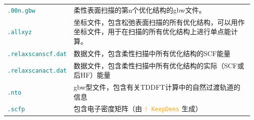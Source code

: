 \documentclass{ctexart}
\newcommand{\cmd}[1]{\textcolor{orange}{ \texttt{#1} }}
\newcommand{\file}[1]{\textcolor{teal}{ \texttt{#1} }}
\begin{document}
\begin{table}[H]
\begin{tabularx}{0.9\linewidth}{lX}
		 \file{.00n.gbw}          & 柔性表面扫描的第n个优化结构的gbw文件。  \\                                                                                              
	 \file{.allxyz}           & 坐标文件，包含松弛表面扫描的所有优化结构，可以用作坐标文件，用于在扫描的所有优化结构上进行单点能计算。   \\                        
		 \file{.relaxscanscf.dat} & 数据文件，包含柔性扫描中所有优化结构的SCF能量    \\                                                                                     
		 \file{.relaxscanact.dat} & 数据文件，包含柔性扫描中所有优化结构的实际（SCF或后HF）能量  \\                                                                         
		 \file{.nto}              & gbw型文件，包含有关TDDFT计算中的自然过渡轨道的信息    \\                                                                                
		\file{.scfp}             & 包含电子密度矩阵（由\cmd{! KeepDens}生成）                   \\                                                                             
			\bottomrule
	\end{tabularx}
	\end{table}
	
	
\end{document}
